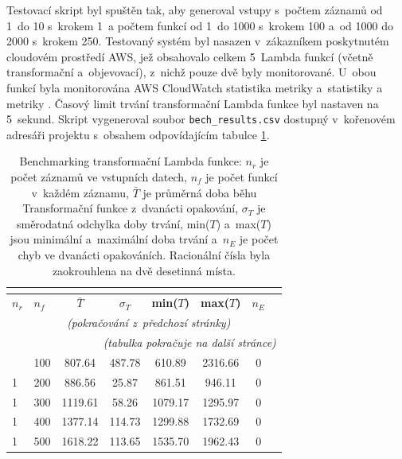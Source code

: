 \documentclass[czech, ing, kiv, he, iso690]{fasthesis}
\begin{document}
Testovací skript byl spuštěn tak, aby generoval vstupy s~počtem záznamů od 1~do 10 s~krokem 1~a počtem funkcí od 1~do 1000 s~krokem 100 a~od 1000 do 2000 s~krokem 250. Testovaný systém byl nasazen v~zákazníkem poskytnutém cloudovém prostředí AWS, jež obsahovalo celkem 5~Lambda funkcí (včetně transformační a~objevovací), z~nichž pouze dvě byly monitorované. U~obou funkcí byla monitorována AWS CloudWatch statistika  metriky  a~statistiky  a~ metriky . Časový limit trvání transformační Lambda funkce byl nastaven na 5~sekund. Skript vygeneroval soubor \verb|bech_results.csv| dostupný v~kořenovém adresáři projektu s~obsahem odpovídajícím tabulce \ref{tab:benchmark}.

\begin{center}
\begin{longtable}{l l | c c c c c c}
\caption{Benchmarking transformační Lambda funkce: $n_r$ je počet záznamů ve vstupních datech, $n_f$ je počet funkcí v~každém záznamu, $\bar{T}$ je průměrná doba běhu Transformační funkce z~dvanácti opakování, $\sigma_T$ je směrodatná odchylka doby trvání, min($T$) a~max($T$) jsou minimální a~maximální doba trvání a~$n_E$ je počet chyb ve dvanácti opakováních. Racionální čísla byla zaokrouhlena na dvě desetinná místa.}\\
\label{tab:benchmark}\\
\toprule[1.5pt]
\textbf{$n_r$} & \textbf{$n_f$} & \textbf{$\bar{T}$} & \textbf{$\sigma_T$} & \textbf{min($T$)} & \textbf{max($T$)} & \textbf{$n_E$}\\
\midrule
\endfirsthead
\multicolumn{8}{c}{\tablename{}~\thetable{}
    \textit{(pokračování z~předchozí stránky)}}\\
\midrule
\midrule
\endhead
\midrule
\multicolumn{8}{r}{%
    \textit{(tabulka pokračuje na další stránce)}}\\
\endfoot
\bottomrule[1.5pt]
\endlastfoot
1 & 100 & 807.64 & 487.78 & 610.89 & 2316.66 & 0 \\ \hline
1 & 200 & 886.56 & 25.87 & 861.51 & 946.11 & 0 \\ \hline
1 & 300 & 1119.61 & 58.26 & 1079.17 & 1295.97 & 0 \\ \hline
1 & 400 & 1377.14 & 114.73 & 1299.88 & 1732.69 & 0 \\ \hline
1 & 500 & 1618.22 & 113.65 & 1535.70 & 1962.43 & 0 \\ \hline

\end{longtable}
\end{center}
\end{document}
